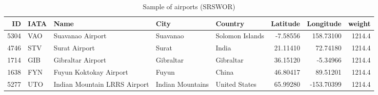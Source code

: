\documentclass[
]{book}
\newenvironment{Shaded}{\begin{snugshade}}{\end{snugshade}}
\newcommand{\CommentTok}[1]{\textcolor[rgb]{0.56,0.35,0.01}{\textit{#1}}}
\newcommand{\ControlFlowTok}[1]{\textcolor[rgb]{0.13,0.29,0.53}{\textbf{#1}}}
\newcommand{\DecValTok}[1]{\textcolor[rgb]{0.00,0.00,0.81}{#1}}
\newcommand{\FunctionTok}[1]{\textcolor[rgb]{0.13,0.29,0.53}{\textbf{#1}}}
\newcommand{\NormalTok}[1]{#1}
\newcommand{\OtherTok}[1]{\textcolor[rgb]{0.56,0.35,0.01}{#1}}
\newcommand{\SpecialCharTok}[1]{\textcolor[rgb]{0.81,0.36,0.00}{\textbf{#1}}}
\begin{document}
\begin{Shaded}
\end{Shaded}

\begin{table}
\centering
\caption{\label{tab:unnamed-chunk-82}Sample of airports (SRSWOR)}
\centering
\begin{tabular}[t]{r|l|l|l|l|r|r|r}
\hline
ID & IATA & Name & City & Country & Latitude & Longitude & weight\\
\hline
5304 & VAO & Suavanao Airport & Suavanao & Solomon Islands & -7.58556 & 158.73100 & 1214.4\\
\hline
4746 & STV & Surat Airport & Surat & India & 21.11410 & 72.74180 & 1214.4\\
\hline
1714 & GIB & Gibraltar Airport & Gibraltar & Gibraltar & 36.15120 & -5.34966 & 1214.4\\
\hline
1638 & FYN & Fuyun Koktokay Airport & Fuyun & China & 46.80417 & 89.51201 & 1214.4\\
\hline
5277 & UTO & Indian Mountain LRRS Airport & Indian Mountains & United States & 65.99280 & -153.70399 & 1214.4\\
\hline
\end{tabular}
\end{table}
\end{document}
